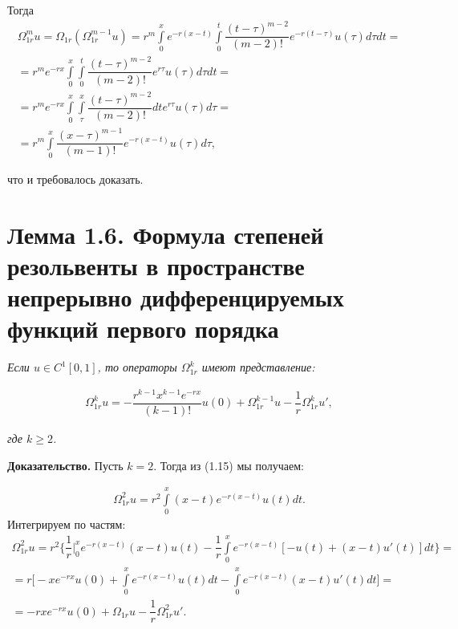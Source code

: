 Тогда
\begin{equation}
\begin{array}{c}
\nonumber

\Omega_{1r}^mu = \Omega_{1r}(\Omega_{1r}^{m-1}u) = r^m\int\limits_0^x e^{-r(x-t)} \int\limits_0^t\dfrac{(t-\tau)^{m-2}}{(m-2)!}e^{-r(t-\tau)}u(\tau)d\tau dt = \\
= r^me^{-rx}\int\limits_0^x\int\limits_0^t\dfrac{(t-\tau)^{m-2}}{(m-2)!}e^{r\tau}u(\tau)d\tau dt = \\
= r^me^{-rx}\int\limits_0^x\int\limits_\tau^x\dfrac{(t-\tau)^{m-2}}{(m-2)!}dte^{r\tau}u(\tau)d\tau = \\
= r^m\int\limits_0^x\dfrac{(x-\tau)^{m-1}}{(m-1)!}e^{-r(x-t)}u(\tau)d\tau,

\end{array}
\end{equation}

что и требовалось доказать.
\section{Лемма 1.6. Формула степеней резольвенты в пространстве непрерывно дифференцируемых функций первого порядка}
\label{lemma1.6}
\textit{Если $ u \in C^1[0,1] $, то операторы $ \Omega_{1r}^k $ имеют представление:}

\begin{equation}
\begin{array}{c}

\Omega_{1r}^ku = -\dfrac{r^{k-1}x^{k-1}e^{-rx}}{(k-1)!}u(0) + \Omega_{1r}^{k-1}u - \dfrac{1}{r}\Omega_{1r}^ku',

\end{array}
\end{equation}

\textit{где $ k \geq 2 $.}

\textbf{Доказательство.} Пусть $ k = 2 $.  Тогда из (1.15) мы получаем:

\begin{equation}
\begin{array}{c}
\nonumber

\Omega_{1r}^2u = r^2\int\limits_0^x (x-t)e^{-r(x-t)}u(t)dt.

\end{array}
\end{equation}
Интегрируем по частям:
\begin{equation}
\begin{array}{c}
\nonumber

\Omega_{1r}^2u = r^2\biggl\lbrace \dfrac{1}{r} \Big\vert_0^x e^{-r(x-t)}(x-t)u(t) - \dfrac{1}{r} \int\limits_0^x e^{-r(x-t)}[-u(t) + (x - t)u'(t)]dt \biggr\rbrace = \\
= r \biggl[ -xe^{-rx}u(0) + \int\limits_0^x e^{-r(x-t)}u(t)dt - \int\limits_0^x e^{-r(x-t)}(x-t)u'(t)dt \biggr] = \\
= -rxe^{-rx}u(0) + \Omega_{1r}u - \dfrac{1}{r}\Omega_{1r}^2u'.

\end{array}
\end{equation}

